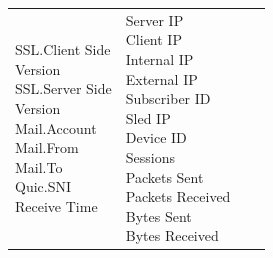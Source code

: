 \begin{description}
\begin{longtable}{p{}|p{}|p{}|p{}}
{                                                                        SSL.Client Side\\ Version\\
                                                                        SSL.Server Side\\ Version\\
                                                                        Mail.Account\\
                                                                        Mail.From\\
                                                                        Mail.To\\
                                                                        Quic.SNI\\
                                                                        Receive Time} & \tabincell{l}{Server IP\\
                                                                                                    Client IP\\
                                                                                                    Internal IP\\
                                                                                                    External IP\\
                                                                                                    Subscriber ID\\
                                                                                                    Sled IP\\
                                                                                                    Device ID\\
                                                                                                    Sessions\\
                                                                                                    Packets Sent\\
                                                                                                    Packets Received\\
                                                                                                    Bytes Sent\\
                                                                                                    Bytes Received\\
}
\end{longtable}
\end{description}
